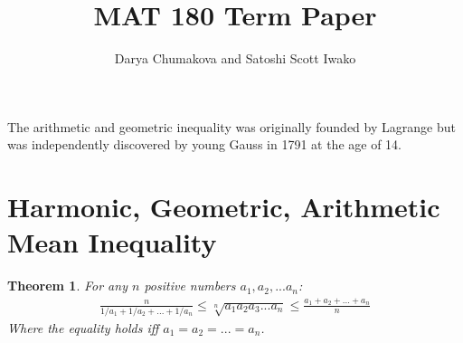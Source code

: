 \documentclass[12pt]{extreport}
\newtheorem*{thm}{Theorem}
\begin{document}
\title{MAT 180 Term Paper}
\author{Darya Chumakova and Satoshi Scott Iwako}
\maketitle


The arithmetic and geometric inequality was originally founded by Lagrange but was independently discovered by young Gauss in 1791 at the age of 14.



\section*{Harmonic, Geometric, Arithmetic Mean Inequality}
\begin{thm}
For any $n$ positive numbers $a_1, a_2, ... a_n$: 
\begin{align*}
\frac{n}{1/a_1 + 1/a_2 + ... + 1/a_n} \leq \sqrt[n]{a_1 a_2 a_3 ... a_n} \leq \frac{a_1 + a_2 + ... + a_n}{n}
\end{align*}
Where the equality holds iff $a_1 = a_2 = ... = a_n$.
\end{thm}
\end{document}
